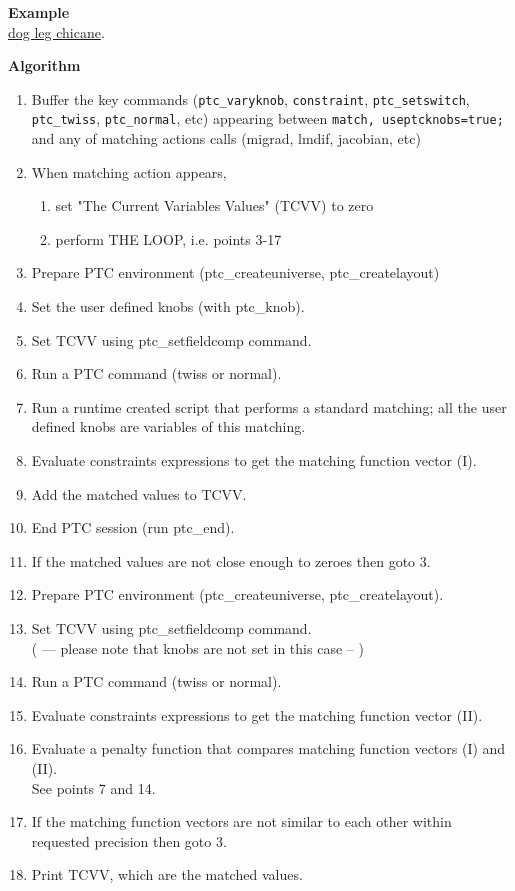 \textbf{Example}\\
\href{http://cern.ch/frs/mad-X_examples/ptc_madx_interface/matchknobs/.madx}{dog leg chicane}.

\textbf{Algorithm}\\
\begin{enumerate}
   \item Buffer the key commands (\texttt{ptc\_varyknob},
     \texttt{constraint}, \texttt{ptc\_setswitch}, \texttt{ptc\_twiss},
     \texttt{ptc\_normal}, etc) appearing between \texttt{match,
       useptcknobs=true;} and any of matching actions calls
     (migrad, lmdif, jacobian, etc)  
   \item  When matching action appears,  
     \begin{enumerate}
       \item set "The Current Variables Values" (TCVV) to zero      
       \item perform THE LOOP, i.e. points 3-17 
     \end{enumerate}
   \item Prepare PTC environment (ptc\_createuniverse,
     ptc\_createlayout)  
   \item Set the user defined knobs (with ptc\_knob).  
   \item Set TCVV using ptc\_setfieldcomp command.  
   \item Run a PTC command (twiss or normal).  
   \item Run a runtime created script that performs a standard matching;
     all the user defined knobs are variables of this matching.  
   \item Evaluate constraints expressions to get the matching function
     vector (I). 
   \item Add the matched values to TCVV. 
   \item End PTC session (run ptc\_end). 
   \item If the matched values are not close enough to zeroes then goto 3.
   \item Prepare PTC environment (ptc\_createuniverse,
     ptc\_createlayout). 
   \item Set TCVV using ptc\_setfieldcomp command.
     \\   ( --- please note that knobs are not set in this case  -- )  
   \item Run a PTC command (twiss or normal).
   \item Evaluate constraints expressions to get the matching function
     vector (II). 
   \item Evaluate a penalty function that compares matching function
     vectors (I) and (II).\\     See points 7 and 14.
   \item If the matching function vectors are not similar to each other
     within requested precision then goto 3. 
   \item Print TCVV, which are the matched values. 
\end{enumerate}


